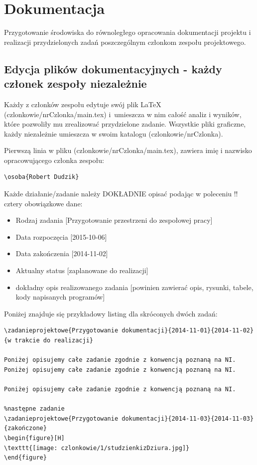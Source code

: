 \section{Dokumentacja}
Przygotowanie środowiska do równoległego opracowania dokumentacji projektu i realizacji przydzielonych zadań poszczególnym członkom zespołu projektowego.

\subsection[Edycja plików dokumentacyjnych]{Edycja plików dokumentacyjnych - każdy członek zespoły niezależnie}
Każdy z członków zespołu edytuje swój plik \LaTeX{} (czlonkowie/nrCzlonka/main.tex) i~umieszcza w nim całość analiz i wyników, które pozwoliły mu zrealizować przydzielone zadanie. Wszystkie pliki graficzne, każdy niezależnie umieszcza w swoim katalogu (czlonkowie/nrCzlonka).

Pierwszą linia w pliku (czlonkowie/nrCzlonka/main.tex), zawiera imię i nazwisko opracowującego członka zespołu:
\begin{lstlisting}
\osoba{Robert Dudzik}
\end{lstlisting}

Każde działanie/zadanie należy DOKŁADNIE opisać podając w poleceniu \s!\zadanieprojektowe! cztery obowiązkowe dane:
\begin{itemize}
\item Rodzaj zadania [Przygotowanie przestrzeni do zespołowej pracy]
\item Data rozpoczęcia [2015-10-06]
\item Data zakończenia [2014-11-02]
\item Aktualny status [zaplanowane do realizacji]
\item dokładny opis realizowanego zadania [powinien zawierać opis, rysunki, tabele, kody napisanych programów]
\end{itemize}

Poniżej znajduje się przykładowy listing dla skróconych dwóch zadań:
\begin{lstlisting}
\zadanieprojektowe{Przygotowanie dokumentacji}{2014-11-01}{2014-11-02}{w trakcie do realizacji}

Poniżej opisujemy całe zadanie zgodnie z konwencją poznaną na NI.
Poniżej opisujemy całe zadanie zgodnie z konwencją poznaną na NI.

Poniżej opisujemy całe zadanie zgodnie z konwencją poznaną na NI. 

%następne zadanie
\zadanieprojektowe{Przygotowanie dokumentacji}{2014-11-03}{2014-11-03}{zakończone}
\begin{figure}[H]
\texttt{[image: czlonkowie/1/studzienkizDziura.jpg]}
\end{figure}
\end{lstlisting}


